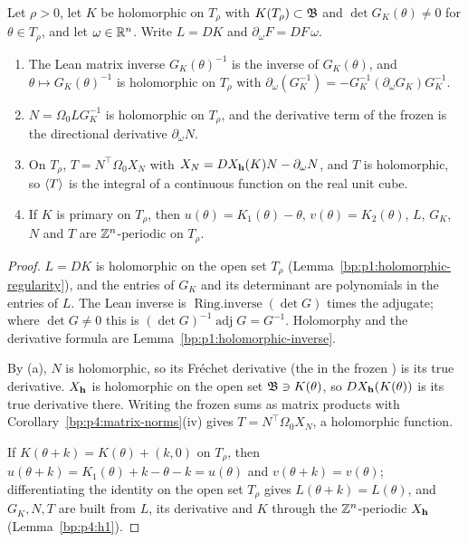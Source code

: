 \begin{lemma}\label{bp:p4:torsion-regular}
Let $\rho>0$, let $K$ be holomorphic on $T_\rho$ with $K(T_\rho)\subset\mathfrak{B}$ and
$\det G_K(\theta)\ne0$ for $\theta\in T_\rho$, and let $\omega\in\mathbb{R}^n$. Write $L=DK$ and
$\partial_\omega F=DF\,\omega$.
\begin{enumerate}[label=(\alph*)]
\item The Lean matrix inverse $G_K(\theta)^{-1}$ is the inverse of $G_K(\theta)$, and
  $\theta\mapsto G_K(\theta)^{-1}$ is holomorphic on $T_\rho$ with
  $\partial_\omega(G_K^{-1})=-G_K^{-1}(\partial_\omega G_K)G_K^{-1}$.
\item $N=\Omega_0LG_K^{-1}$ is holomorphic on $T_\rho$, and the derivative term of the frozen
   is the directional derivative $\partial_\omega N$.
\item On $T_\rho$, $T=N^\top\Omega_0X_N$ with $X_N=DX_{\mathbf{h}}(K)N-\partial_\omega N$, and $T$ is
  holomorphic, so $\langle T\rangle$ is the integral of a continuous function on the real unit cube.
\item If $K$ is primary on $T_\rho$, then $u(\theta)=K_1(\theta)-\theta$, $v(\theta)=K_2(\theta)$,
  $L$, $G_K$, $N$ and $T$ are $\mathbb{Z}^n$-periodic on $T_\rho$.
\end{enumerate}
\end{lemma}

\begin{proof}
\label{step:p4:tr-inverse}
$L=DK$ is holomorphic on the open set $T_\rho$ (Lemma~\ref{bp:p1:holomorphic-regularity}), and the entries of $G_K$ and its determinant are
polynomials in the entries of $L$. The Lean inverse is $\operatorname{Ring.inverse}(\det G)$ times
the adjugate; where $\det G\ne0$ this is $(\det G)^{-1}\operatorname{adj}G=G^{-1}$. Holomorphy and
the derivative formula are Lemma~\ref{bp:p1:holomorphic-inverse}.

\label{step:p4:tr-torsion}
By (a), $N$ is holomorphic, so its Fréchet derivative (the  in the frozen
) is its true derivative. $X_{\mathbf{h}}$ is holomorphic on the open set $\mathfrak{B}\ni K(\theta)$,
so $DX_{\mathbf{h}}(K(\theta))$ is its true derivative there. Writing the frozen sums as matrix products
with Corollary~\ref{bp:p4:matrix-norms}(iv) gives $T=N^\top\Omega_0X_N$, a holomorphic function.

\label{step:p4:tr-periodic}
If $K(\theta+k)=K(\theta)+(k,0)$ on $T_\rho$, then $u(\theta+k)=K_1(\theta)+k-\theta-k=u(\theta)$
and $v(\theta+k)=v(\theta)$; differentiating the identity on the open set $T_\rho$ gives
$L(\theta+k)=L(\theta)$, and $G_K,N,T$ are built from $L$, its derivative and $K$ through the
$\mathbb{Z}^n$-periodic $X_{\mathbf{h}}$ (Lemma~\ref{bp:p4:h1}).
\end{proof}

